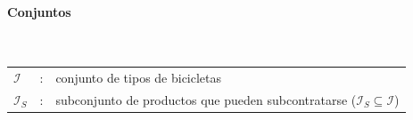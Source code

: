 




\paragraph{Conjuntos}\mbox{}\\
\begin{tabular}{lcl}
$\mathcal{I}$      & : & conjunto de tipos de bicicletas \\
$\mathcal{I}_S$    & : & subconjunto de productos que pueden subcontratarse ($\mathcal{I}_S \subseteq \mathcal{I}$) \\
\end{tabular}

